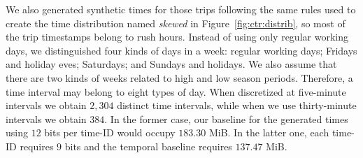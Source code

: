 \begin{itemize}
	We also generated synthetic times for those trips following the same rules used to create the time distribution
	named \textit{skewed} in Figure~\ref{fig:ctr:distrib}, so most of the trip timestamps belong to rush hours. 
	Instead of using only regular working days, we distinguished four kinds of days in a week:
	regular working days; Fridays and holiday eves; Saturdays; and Sundays and holidays. We also 
	assume that there are two kinds of weeks related to high and low season periods. 
	Therefore, a time interval may belong to eight types of day. 
	When discretized at five-minute intervals we obtain $2,\!304$ distinct time intervals, 
	while when we use thirty-minute intervals we obtain $384$. In the former case, our  baseline
	 for the generated times using  $12$ bits per time-ID would occupy $183.30$ MiB. In the latter one, each time-ID requires  $9$ bits and the  temporal baseline requires $137.47$ MiB.
	 

\end{itemize}
